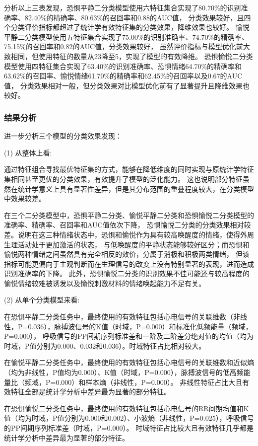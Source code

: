 \clearpage
分析以上三表发现，恐惧平静二分类模型使用六特征集合实现了80.70\%的识别准确率、82.40\%的精确率、80.63\%的召回率和0.88的AUC值，
分类效果较好，且四个分类评价指标都超过了统计学有效特征集的分类效果，降维效果也较好。
愉悦平静二分类模型使用五特征集合实现了75.00\%的识别准确率、74.70\%的精确率、75.15\%的召回率和0.82的AUC值，分类效果较好，
虽然评价指标与模型优化前大致相同，但使用特征的数量从23降至5，实现了模型的有效降维。
恐惧愉悦二分类模型使用四特征集合实现了63.40\%的识别准确率、恐惧情绪64.70\%的精确率和63.62\%的召回率、愉悦情绪61.70\%的精确率和62.45\%的召回率以及0.67的AUC值，
分类效果相对一般，但分类效果对比模型优化前有了显著提升且降维效果也较好。

\subsubsection{结果分析}
进一步分析三个模型的分类效果发现：

(1) 从整体上看: 

通过特征组合寻找最优特征集的方式，能够在降低维度的同时实现与原统计学特征集相同甚至更优的分类效果，有效提升了模型的泛化能力。
这也说明部分特征虽然在统计学意义上具有显著性差异，但是其分布范围的重叠程度较大，在分类模型中效果较差。

在三个二分类模型中，恐惧平静二分类、愉悦平静二分类和恐惧愉悦二分类模型的准确率、精确率、召回率和AUC值依次下降，
恐惧愉悦二分类的分类效果相对较差。说明在这三种情绪状态中，恐惧和愉悦作为具有较高唤醒度的情绪，使得外周生理活动处于更加激活的状态，
与低唤醒度的平静状态能够较好区分；而恐惧和愉悦两种情绪之间虽然具有完全相反的效价，分属于消极和积极两类情绪，
但该指标可能更偏向于主观判断而在生理信号的改变上没有特别显著的表现，进而造成识别准确率的下降。
此外，恐惧愉悦二分类的识别效果不佳可能还与较高程度的愉悦情绪较难被诱发以及愉悦刺激材料的情绪唤起能力不足有关。

(2) 从单个分类模型来看: 

在恐惧平静二分类任务中，最终使用的有效特征包括心电信号的关联维数（非线性，P=0.036），脉搏波信号的K值（时域，P=0.000）和标准化低频能量（频域，P=0.000），
呼吸信号的PP间期序列标准差和一阶及二阶差分绝对值的均值（均为时域，P值分别为0.000、0.032和0.036）。时域特征占比相对较大。

在愉悦平静二分类任务中，最终使用的有效特征包括心电信号的关联维数和近似熵（均为非线性，P值均为0.000）、K值（时域，P=0.000），脉搏波信号的低高频能量比（频域，P=0.000）和样本熵（非线性，P=0.000）。
非线性特征占比大且有效特征全部是统计学分析中差异最为显著的部分特征。

在恐惧愉悦二分类任务中，最终使用的有效特征包括心电信号的RR间期均值和K值（均为时域，P值分别为0.000和0.002）、小波熵（非线性，P=0.025），呼吸信号的PP间期序列标准差（时域，P=0.000）。
时域特征占比较大且有效特征几乎都是统计学分析中差异最为显著的部分特征。


